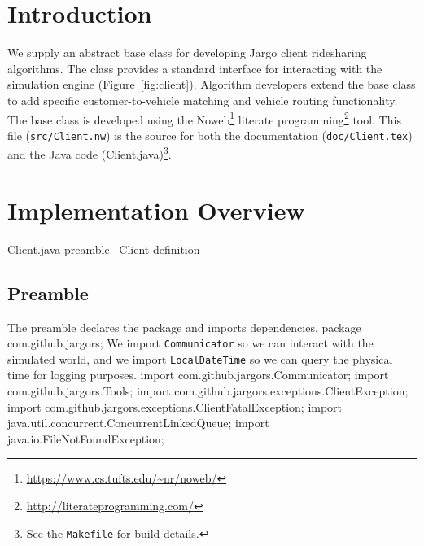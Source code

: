 \section{Introduction}
\label{sec:introduction}
We supply an abstract base class for developing Jargo client ridesharing
algorithms. The class provides a standard interface for interacting with the
simulation engine (Figure~\ref{fig:client}). Algorithm developers extend the
base class to add specific customer-to-vehicle matching and vehicle routing
functionality.  The base class is developed using the
Noweb\footnote{\url{https://www.cs.tufts.edu/~nr/noweb/}} literate
programming\footnote{\url{http://literateprogramming.com/}} tool.  This file
({\tt{}src/Client.nw}) is the source for both the documentation
({\tt{}doc/Client.tex}) and the Java code (Client.java)\footnote{See the
{\tt{}Makefile} for build details.}.

\section{Implementation Overview}
\endmoddef{}
\LA{}Client.java preamble~{\nwtagstyle{}}\RA{}
\LA{}\code{}Client\edoc{} definition~{\nwtagstyle{}}\RA{}
\nwendcode{}\nwdocspar

\subsection{Preamble}
The preamble declares the package and imports dependencies.
\nwenddocs{}\endmoddef{}
package com.github.jargors;
\nwendcode{}\nwdocspar
We import {\tt{}Communicator} so we can interact with the simulated world,
and we import {\tt{}LocalDateTime} so we can query the physical time for
logging purposes.
\nwenddocs{}\plusendmoddef
import com.github.jargors.Communicator;
import com.github.jargors.Tools;
import com.github.jargors.exceptions.ClientException;
import com.github.jargors.exceptions.ClientFatalException;
import java.util.concurrent.ConcurrentLinkedQueue;
import java.io.FileNotFoundException;
\nwendcode{}\nwdocspar

